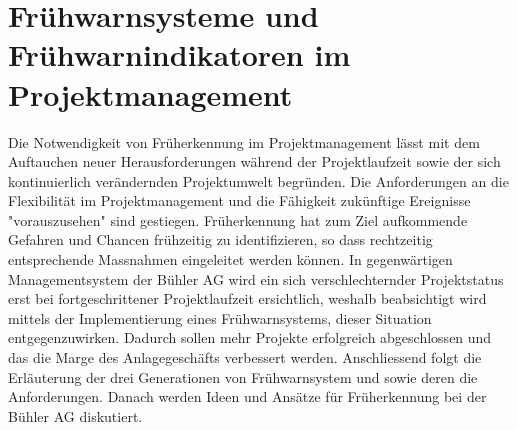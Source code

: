 \chapter{Frühwarnsysteme und Frühwarnindikatoren im Projektmanagement}\label{sec:vier}
Die Notwendigkeit von Früherkennung im Projektmanagement lässt mit dem Auftauchen neuer Herausforderungen während der Projektlaufzeit sowie der sich kontinuierlich verändernden Projektumwelt begründen. Die Anforderungen an die Flexibilität im Projektmanagement und die Fähigkeit zukünftige Ereignisse "vorauszusehen" sind gestiegen. Früherkennung hat zum Ziel aufkommende Gefahren und Chancen frühzeitig zu identifizieren, so dass rechtzeitig entsprechende Massnahmen eingeleitet werden können. In gegenwärtigen Managementsystem der Bühler AG wird ein sich verschlechternder Projektstatus erst bei fortgeschrittener Projektlaufzeit ersichtlich, weshalb beabsichtigt wird mittels der Implementierung eines Frühwarnsystems, dieser Situation entgegenzuwirken. Dadurch sollen mehr Projekte erfolgreich abgeschlossen und das die Marge des Anlagegeschäfts verbessert werden. Anschliessend folgt die Erläuterung der drei Generationen von Frühwarnsystem und sowie deren die Anforderungen. Danach werden Ideen und Ansätze für Früherkennung bei der Bühler AG diskutiert.
